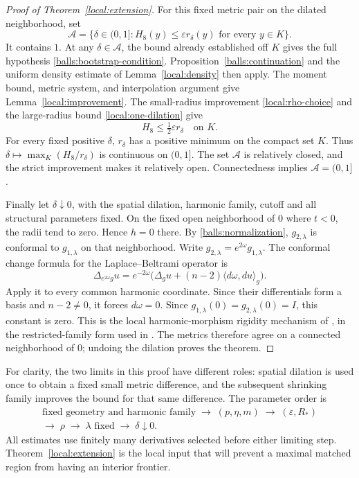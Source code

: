 \begin{proof}[Proof of Theorem~\ref{local:extension}]
For this fixed metric pair on the dilated neighborhood, set
\[
 \mathcal A=\{\delta\in(0,1]:
        H_8(y)\leq\varepsilon r_\delta(y)\text{ for every }y\in K\}.
\]
It contains $1$.  At any $\delta\in\mathcal A$, the bound already
established off $K$ gives the full hypothesis
\eqref{balls:bootstrap-condition}.  Proposition~\ref{balls:continuation}
and the uniform density estimate of Lemma~\ref{local:density} then apply.
The moment bound, metric system, and interpolation argument give
Lemma~\ref{local:improvement}.
The small-radius improvement \eqref{local:rho-choice} and the
large-radius bound \eqref{local:one-dilation} give
\[
 H_8\leq\tfrac12\varepsilon r_\delta\quad\text{on }K.
\]
For every fixed positive $\delta$, $r_\delta$ has a positive minimum
on the compact set $K$.  Thus
$\delta\mapsto\max_K(H_8/r_\delta)$ is continuous on $(0,1]$.
The set $\mathcal A$ is relatively closed, and the strict improvement
makes it relatively open.  Connectedness implies
$\mathcal A=(0,1]$.

Finally let $\delta\downarrow0$, with the spatial dilation, harmonic
family, cutoff and all structural parameters fixed.  On the fixed
open neighborhood of $0$ where $t<0$, the radii tend to zero.  Hence
$h=0$ there.  By \eqref{balls:normalization}, $g_{2,\lambda}$ is
conformal to $g_{1,\lambda}$ on that neighborhood.  Write
$g_{2,\lambda}=e^{2\omega}g_{1,\lambda}$.  The conformal change formula
for the Laplace--Beltrami operator is
\[
 \Delta_{e^{2\omega}g}u
  =e^{-2\omega}\bigl(\Delta_g u
                 +(n-2)\langle d\omega,du\rangle_g\bigr).
\]
Apply it to every common harmonic coordinate.  Since their
differentials form a basis and $n-2\ne0$, it forces $d\omega=0$.
Since $g_{1,\lambda}(0)=g_{2,\lambda}(0)=I$, this constant is zero.
This is the local harmonic-morphism rigidity mechanism of
\citep[Section~8]{Fuglede1978}, in the restricted-family form used in
\citep[Proposition~4.1]{LLS20}.
The metrics therefore agree on a connected neighborhood of $0$;
undoing the dilation proves the theorem.
\end{proof}

For clarity, the two limits in this proof have different roles:
spatial dilation is used once to obtain a fixed small metric
difference, and the subsequent shrinking family improves the bound
for that same difference.  The parameter order is
\begin{equation}\label{local:parameter-order}
 \begin{gathered}
 \text{fixed geometry and harmonic family}
   \;\longrightarrow\;(p,\eta,m)
   \;\longrightarrow\;(\varepsilon,R_*)\\
 \longrightarrow\;\rho\;\longrightarrow\;
 \lambda\text{ fixed}\;\longrightarrow\;\delta\downarrow0.
 \end{gathered}
\end{equation}
All estimates use finitely many derivatives selected before either
limiting step.  Theorem~\ref{local:extension} is the local input that
will prevent a maximal matched region from having an interior
frontier.
